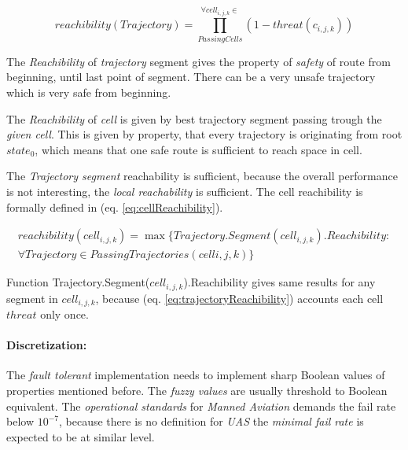 \begin{equation}\label{eq:trajectoryReachibility}
    reachibility(Trajectory) = \prod_{Passing Cells}^{\forall cell_{i,j,k}\in} \left(1- threat(c_{i,j,k})\right)
\end{equation}

\begin{note}
    The \emph{Reachibility} of \emph{trajectory} segment gives the property of \emph{safety} of route from beginning, until last point of segment. There can be a very unsafe trajectory which is very safe from beginning.
\end{note}


The \emph{Reachibility} of \emph{cell} is given by best trajectory segment passing trough the \emph{given cell}. This is given by property, that every trajectory is originating from root $state_0$, which means that one safe route is sufficient to reach space in cell.

The \emph{Trajectory segment} reachability is sufficient, because the overall performance is not interesting, the \emph{local reachability} is sufficient. The cell reachibility is formally defined in (eq. \ref{eq:cellReachibility}).

\begin{multline}\label{eq:cellReachibility}
    reachibility(cell_{i,j,k}) = \max\{Trajectory.Segment(cell_{i,j,k}).Reachibility: \\\forall Trajectory \in Passing Trajectories (cell{i,j,k})\}
\end{multline}
    
\begin{note}
    Function Trajectory.Segment($cell_{i,j,k}$).Reachibility gives same results for any segment in $cell_{i,j,k}$, because (eq. \ref{eq:trajectoryReachibility}) accounts each cell $threat$ only once.
\end{note}

\paragraph{Discretization:} The \emph{fault tolerant} implementation needs to implement sharp Boolean values of properties mentioned before. The \emph{fuzzy values} are usually threshold to Boolean equivalent. The \emph{operational standards} for \emph{Manned Aviation} \cite{icao4444} demands the fail rate below $10^{-7}$, because there is no definition for \emph{UAS} the \emph{minimal fail rate} is expected to be at similar level.

